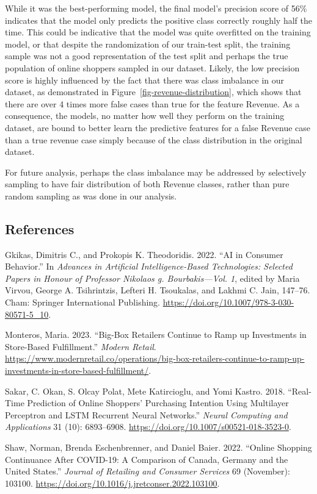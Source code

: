 \documentclass[
  letterpaper,
  DIV=11,
  numbers=noendperiod]{scrartcl}
\newlength{\cslhangindent}
\newenvironment{CSLReferences}[2] %
 {\begin{list}{}{%
  \setlength{\itemindent}{0pt}
  \setlength{\leftmargin}{0pt}
  \setlength{\parsep}{0pt}
  \ifodd #1
   \setlength{\leftmargin}{\cslhangindent}
   \setlength{\itemindent}{-1\cslhangindent}
  \fi
  \setlength{\itemsep}{#2\baselineskip}}}
 {\end{list}}
\begin{document}
While it was the best-performing model, the final model's precision
score of 56\% indicates that the model only predicts the positive class
correctly roughly half the time. This could be indicative that the model
was quite overfitted on the training model, or that despite the
randomization of our train-test split, the training sample was not a
good representation of the test split and perhaps the true population of
online shoppers sampled in our dataset. Likely, the low precision score
is highly influenced by the fact that there was class imbalance in our
dataset, as demonstrated in Figure~\ref{fig-revenue-distribution}, which
shows that there are over 4 times more false cases than true for the
feature Revenue. As a consequence, the models, no matter how well they
perform on the training dataset, are bound to better learn the
predictive features for a false Revenue case than a true revenue case
simply because of the class distribution in the original dataset.

For future analysis, perhaps the class imbalance may be addressed by
selectively sampling to have fair distribution of both Revenue classes,
rather than pure random sampling as was done in our analysis.

\subsection*{References}\label{references}

\label{refs}
\begin{CSLReferences}{1}{0}
Gkikas, Dimitris C., and Prokopis K. Theodoridis. 2022. {``AI in
Consumer Behavior.''} In \emph{Advances in Artificial Intelligence-Based
Technologies: Selected Papers in Honour of Professor Nikolaos g.
Bourbakis---Vol. 1}, edited by Maria Virvou, George A. Tsihrintzis,
Lefteri H. Tsoukalas, and Lakhmi C. Jain, 147--76. Cham: Springer
International Publishing.
\url{https://doi.org/10.1007/978-3-030-80571-5_10}.

Monteros, Maria. 2023. {``Big-Box Retailers Continue to Ramp up
Investments in Store-Based Fulfillment.''} \emph{Modern Retail}.
\url{https://www.modernretail.co/operations/big-box-retailers-continue-to-ramp-up-investments-in-store-based-fulfillment/}.

Sakar, C. Okan, S. Olcay Polat, Mete Katircioglu, and Yomi Kastro. 2018.
{``Real-Time Prediction of Online Shoppers' Purchasing Intention Using
Multilayer Perceptron and LSTM Recurrent Neural Networks.''}
\emph{Neural Computing and Applications} 31 (10): 6893--6908.
\url{https://doi.org/10.1007/s00521-018-3523-0}.

Shaw, Norman, Brenda Eschenbrenner, and Daniel Baier. 2022. {``Online
Shopping Continuance After COVID-19: A Comparison of Canada, Germany and
the United States.''} \emph{Journal of Retailing and Consumer Services}
69 (November): 103100.
\url{https://doi.org/10.1016/j.jretconser.2022.103100}.

\end{CSLReferences}
\end{document}
